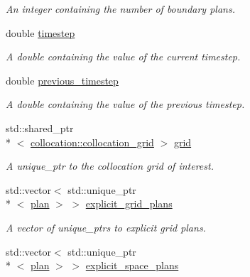 \begin{DoxyCompactItemize}
\begin{DoxyCompactList}\small\item\em An integer containing the number of boundary plans. \end{DoxyCompactList}\item 
\hypertarget{classelement_1_1element_adbb8ab346ea8e82b0f4ab430a8758f06}{double \hyperlink{classelement_1_1element_adbb8ab346ea8e82b0f4ab430a8758f06}{timestep}}\label{classelement_1_1element_adbb8ab346ea8e82b0f4ab430a8758f06}

\begin{DoxyCompactList}\small\item\em A double containing the value of the current timestep. \end{DoxyCompactList}\item 
\hypertarget{classelement_1_1element_a1d3dab98f21d0867275fc1a0a12e8519}{double \hyperlink{classelement_1_1element_a1d3dab98f21d0867275fc1a0a12e8519}{previous\-\_\-timestep}}\label{classelement_1_1element_a1d3dab98f21d0867275fc1a0a12e8519}

\begin{DoxyCompactList}\small\item\em A double containing the value of the previous timestep. \end{DoxyCompactList}\item 
\hypertarget{classelement_1_1element_afc376c5fee8b02ee93ca2d85dc4885db}{std\-::shared\-\_\-ptr\\*
$<$ \hyperlink{classcollocation_1_1collocation__grid}{collocation\-::collocation\-\_\-grid} $>$ \hyperlink{classelement_1_1element_afc376c5fee8b02ee93ca2d85dc4885db}{grid}}\label{classelement_1_1element_afc376c5fee8b02ee93ca2d85dc4885db}

\begin{DoxyCompactList}\small\item\em A unique\-\_\-ptr to the collocation grid of interest. \end{DoxyCompactList}\item 
\hypertarget{classelement_1_1element_a56f12828a1f17236ec40ee69022dbb95}{std\-::vector$<$ std\-::unique\-\_\-ptr\\*
$<$ \hyperlink{classplan}{plan} $>$ $>$ \hyperlink{classelement_1_1element_a56f12828a1f17236ec40ee69022dbb95}{explicit\-\_\-grid\-\_\-plans}}\label{classelement_1_1element_a56f12828a1f17236ec40ee69022dbb95}

\begin{DoxyCompactList}\small\item\em A vector of unique\-\_\-ptrs to explicit grid plans. \end{DoxyCompactList}\item 
\hypertarget{classelement_1_1element_af91fb5622e48f98e39e42867be1d2f4e}{std\-::vector$<$ std\-::unique\-\_\-ptr\\*
$<$ \hyperlink{classplan}{plan} $>$ $>$ \hyperlink{classelement_1_1element_af91fb5622e48f98e39e42867be1d2f4e}{explicit\-\_\-space\-\_\-plans}}\label{classelement_1_1element_af91fb5622e48f98e39e42867be1d2f4e}


\end{DoxyCompactItemize}
